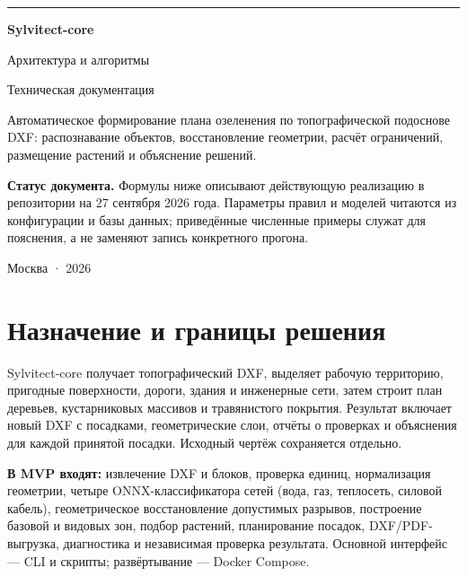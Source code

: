 \documentclass[11pt,a4paper]{article}
\begin{document}
\begin{titlepage}
\vspace*{28mm}
{\color{blue}\rule{35mm}{2.5pt}}\par\vspace{13mm}
{\Huge\bfseries\color{ink}Sylvitect-core}\par\vspace{5mm}
{\LARGE Архитектура и алгоритмы}\par\vspace{3mm}
{\Large Техническая документация}\par
\vspace{17mm}
\begin{minipage}{0.84\linewidth}
Автоматическое формирование плана озеленения по топографической подоснове DXF: распознавание объектов, восстановление геометрии, расчёт ограничений, размещение растений и объяснение решений.
\end{minipage}
\vfill
\noindent\colorbox{pale}{\parbox{0.82\linewidth}{\textbf{Статус документа.} Формулы ниже описывают действующую реализацию в репозитории на 27 сентября 2026 года. Параметры правил и моделей читаются из конфигурации и базы данных; приведённые численные примеры служат для пояснения, а не заменяют запись конкретного прогона.}}\par
\vspace{12mm}
\noindent Москва · 2026
\end{titlepage}

\tableofcontents
\clearpage

\section{Назначение и границы решения}
Sylvitect-core получает топографический DXF, выделяет рабочую территорию, пригодные поверхности, дороги, здания и инженерные сети, затем строит план деревьев, кустарниковых массивов и травянистого покрытия. Результат включает новый DXF с посадками, геометрические слои, отчёты о проверках и объяснения для каждой принятой посадки. Исходный чертёж сохраняется отдельно.

\textbf{В MVP входят:} извлечение DXF и блоков, проверка единиц, нормализация геометрии, четыре ONNX-классификатора сетей (вода, газ, теплосеть, силовой кабель), геометрическое восстановление допустимых разрывов, построение базовой и видовых зон, подбор растений, планирование посадок, DXF/PDF-выгрузка, диагностика и независимая проверка результата. Основной интерфейс --- CLI и скрипты; развёртывание --- Docker Compose.
\end{document}
